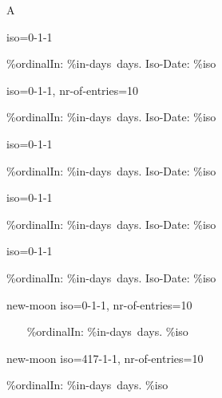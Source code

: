 \documentclass[paper=landscape]{scrartcl}
\begin{document}
\newpage


A
\par


\GetNextMoonphase {} { iso=0-1-1 } 
  {  
     \%{ordinal}\space In: \%{in-days}\ days. Iso-Date: \%{iso} \par
  }
\par

\GetNextMoonphase {} { iso=0-1-1, nr-of-entries=10 } 
  {  
     \%{ordinal}\space In: \%{in-days}\ days. Iso-Date: \%{iso} \par
  }

\GetNextMoonphase {} { iso=0-1-1 } 
  {  
     \%{ordinal}\space In: \%{in-days}\ days. Iso-Date: \%{iso} \par
  }

\GetNextMoonphase {} { iso=0-1-1 } 
  {       
    \%{ordinal}\space In: \%{in-days}\ days. Iso-Date: \%{iso} \par
  }

\GetNextMoonphase  {} { iso=0-1-1 } 
  {  
     \%{ordinal}\space In: \%{in-days}\ days. Iso-Date: \%{iso} \par
  }

\par

\CompareMoons { \Solena, \Eria, \Surios } { new-moon } { iso=0-1-1, nr-of-entries=10 } 
  {
    \   \ \
    \%{ordinal}\space In: \%{in-days}\ days. \%{iso} 
    \par
 }

\par
\CompareMoons { \Solena, \Eria, \Surios } { new-moon } { iso=417-1-1, nr-of-entries=10 } 
  {
    
    \%{ordinal}\space In: \%{in-days}\ days. \%{iso} 
    \par
 }




\end{document}
